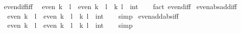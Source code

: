 \begin{isabellebody}
\isanewline
%
\endisadelimproof
\isanewline
{}\isamarkupfalse%
%
\isadelimdocument
%
\endisadelimdocument
%
\isatagdocument
%
\isamarkuptrue%
%
\endisatagdocument
{\isafolddocument}%
%
\isadelimdocument
%
\endisadelimdocument
{}\isamarkupfalse%
\ even{\isacharunderscore}{\kern0pt}diff{\isacharunderscore}{\kern0pt}iff{\isacharcolon}{\kern0pt}\isanewline
\ \ {\isachardoublequoteopen}even\ {\isacharparenleft}{\kern0pt}k\ {\isacharminus}{\kern0pt}\ l{\isacharparenright}{\kern0pt}\ {\isasymlongleftrightarrow}\ even\ {\isacharparenleft}{\kern0pt}k\ {\isacharplus}{\kern0pt}\ l{\isacharparenright}{\kern0pt}{\isachardoublequoteclose}\ \ k\ l\ {\isacharcolon}{\kern0pt}{\isacharcolon}{\kern0pt}\ int\isanewline
%
\isadelimproof
\ \ %
\endisadelimproof
%
\isatagproof
{}\isamarkupfalse%
\ {\isacharparenleft}{\kern0pt}fact\ even{\isacharunderscore}{\kern0pt}diff{\isacharparenright}{\kern0pt}%
\endisatagproof
{\isafoldproof}%
%
\isadelimproof
\isanewline
%
\endisadelimproof
\isanewline
{}\isamarkupfalse%
\ even{\isacharunderscore}{\kern0pt}abs{\isacharunderscore}{\kern0pt}add{\isacharunderscore}{\kern0pt}iff{\isacharcolon}{\kern0pt}\isanewline
\ \ {\isachardoublequoteopen}even\ {\isacharparenleft}{\kern0pt}{\isasymbar}k{\isasymbar}\ {\isacharplus}{\kern0pt}\ l{\isacharparenright}{\kern0pt}\ {\isasymlongleftrightarrow}\ even\ {\isacharparenleft}{\kern0pt}k\ {\isacharplus}{\kern0pt}\ l{\isacharparenright}{\kern0pt}{\isachardoublequoteclose}\ \ k\ l\ {\isacharcolon}{\kern0pt}{\isacharcolon}{\kern0pt}\ int\isanewline
%
\isadelimproof
\ \ %
\endisadelimproof
%
\isatagproof
{}\isamarkupfalse%
\ simp%
\endisatagproof
{\isafoldproof}%
%
\isadelimproof
\isanewline
%
\endisadelimproof
\isanewline
{}\isamarkupfalse%
\ even{\isacharunderscore}{\kern0pt}add{\isacharunderscore}{\kern0pt}abs{\isacharunderscore}{\kern0pt}iff{\isacharcolon}{\kern0pt}\isanewline
\ \ {\isachardoublequoteopen}even\ {\isacharparenleft}{\kern0pt}k\ {\isacharplus}{\kern0pt}\ {\isasymbar}l{\isasymbar}{\isacharparenright}{\kern0pt}\ {\isasymlongleftrightarrow}\ even\ {\isacharparenleft}{\kern0pt}k\ {\isacharplus}{\kern0pt}\ l{\isacharparenright}{\kern0pt}{\isachardoublequoteclose}\ \ k\ l\ {\isacharcolon}{\kern0pt}{\isacharcolon}{\kern0pt}\ int\isanewline
%
\isadelimproof
\ \ %
\endisadelimproof
%
\isatagproof
{}\isamarkupfalse%
\ simp%
\endisatagproof
{\isafoldproof}%
%
\isadelimproof
\isanewline
%
\endisadelimproof
\isanewline

\end{isabellebody}
